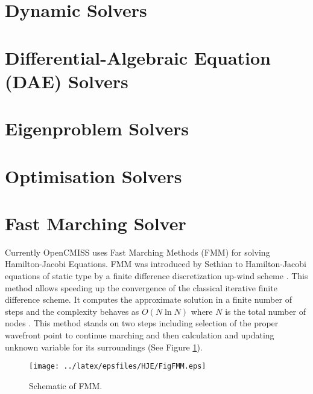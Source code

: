 \section{Dynamic Solvers}

\section{Differential-Algebraic Equation (DAE) Solvers }

\section{Eigenproblem Solvers}

\section{Optimisation Solvers}

\section{Fast Marching Solver}

\noindent Currently OpenCMISS uses Fast Marching Methods (FMM) for solving Hamilton-Jacobi Equations. FMM was introduced by Sethian to Hamilton-Jacobi equations of static type by a finite difference discretization up-wind scheme \cite{sethian:1996}. This method allows speeding up the convergence of the classical iterative finite difference scheme. It computes the approximate solution in a finite number of steps and the complexity behaves as $O(N\ln N)$ where $N$ is the total number of nodes \cite{mauch:2003}. This method stands on two steps including selection of the proper wavefront point to continue marching and then calculation and updating unknown variable for its surroundings (See Figure \ref{fig:FMM}).

\begin{figure}[h!]
  \centering
    \texttt{[image: ../latex/epsfiles/HJE/FigFMM.eps]}
  \caption{Schematic of FMM.}
  \label{fig:FMM}
\end{figure}

